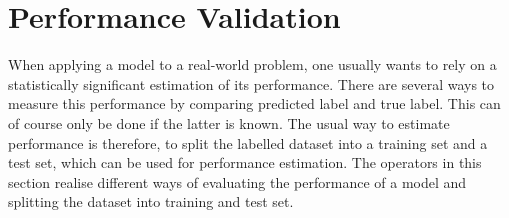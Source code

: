 \section{Performance Validation}

When applying a model to a real-world problem, one usually wants to
rely on a statistically significant estimation of its
performance. There are several ways to measure this performance
by comparing predicted label and true label. This can of course
only be done if the latter is known. The usual way to estimate
performance is therefore, to split the labelled dataset into a
training set and a test set, which can be used for performance
estimation. The operators in this section realise different ways of
evaluating the performance of a model and splitting the dataset into
training and test set.
